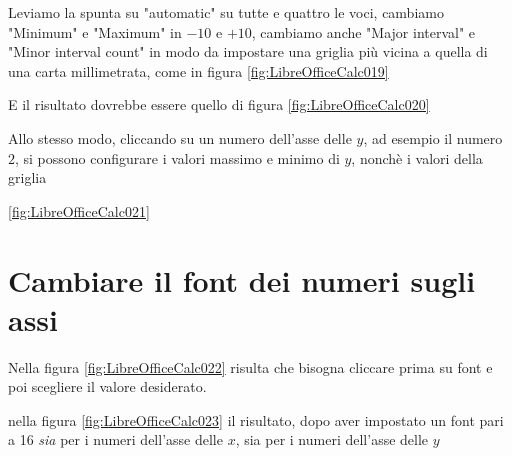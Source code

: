 \documentclass[17pt]{extarticle}
\begin{document}



Leviamo la spunta su "automatic" su tutte e quattro le voci, cambiamo "Minimum" e "Maximum" in $-10$ e $+10$, cambiamo anche "Major interval" e "Minor interval count" in modo da impostare una griglia più vicina a quella di una carta millimetrata, come in figura \ref{fig:LibreOfficeCalc019}





E il risultato dovrebbe essere quello di figura \ref{fig:LibreOfficeCalc020}



Allo stesso modo, cliccando su un numero dell'asse delle $y$, ad esempio il numero $2$, si possono configurare i valori massimo e minimo di $y$, nonchè i valori della griglia

\ref{fig:LibreOfficeCalc021}




\newpage
\section{Cambiare il font dei numeri sugli assi}

Nella figura \ref{fig:LibreOfficeCalc022} risulta che bisogna cliccare prima su font e poi scegliere il valore desiderato.


nella figura \ref{fig:LibreOfficeCalc023} il risultato, dopo aver impostato un font pari a 16 \emph{sia} per i numeri dell'asse delle $x$, sia per i numeri dell'asse delle $y$


\end{document}
